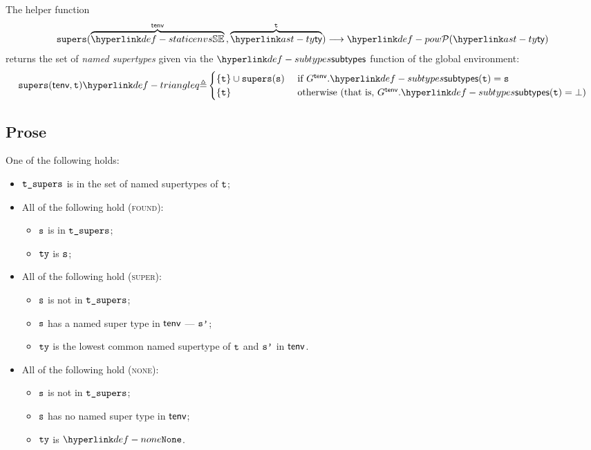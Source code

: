 \newcommand\supers[0]{\texttt{supers}}
The helper function
\[
  \supers(\overname{\staticenvs}{\tenv} \aslsep \overname{\ty}{\vt})
  \aslto \pow{\ty}
\]
returns the set of \emph{named supertypes} given via the $\subtypes$ function of the global environment:
\[
  \supers(\tenv, \vt) \triangleq
  \begin{cases}
    \{\vt\} \cup \supers(\vs) & \text{ if }G^\tenv.\subtypes(\vt) = \vs\\
    \{\vt\}  & \text{ otherwise } (\text{that is, }G^\tenv.\subtypes(\vt) = \bot)\\
  \end{cases}
\]

\subsection{Prose}
One of the following holds:
\begin{itemize}
  \item $\texttt{t\_supers}$ is in the set of named supertypes of $\texttt{t}$;
  \item All of the following hold (\textsc{found}):
  \begin{itemize}
    \item $\texttt{s}$ is in $\texttt{t\_supers}$;
    \item $\texttt{ty}$ is $\texttt{s}$;
  \end{itemize}

  \item All of the following hold (\textsc{super}):
  \begin{itemize}
    \item $\texttt{s}$ is not in $\texttt{t\_supers}$;
    \item $\texttt{s}$ has a named super type in $\textsf{tenv}$ --- $\texttt{s'}$;
    \item $\texttt{ty}$ is the lowest common named supertype of $\texttt{t}$ and $\texttt{s'}$ in $\textsf{tenv}$.
  \end{itemize}

  \item All of the following hold (\textsc{none}):
  \begin{itemize}
    \item $\texttt{s}$ is not in $\texttt{t\_supers}$;
    \item $\texttt{s}$ has no named super type in $\textsf{tenv}$;
    \item $\texttt{ty}$ is $\None$.
  \end{itemize}
\end{itemize}

